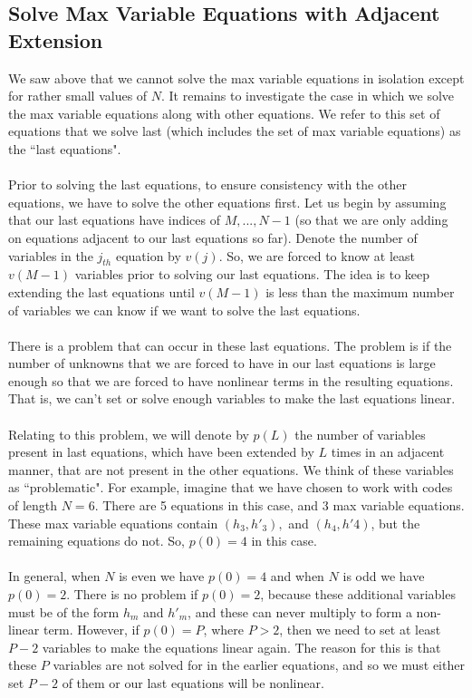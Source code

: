 \documentclass[a4paper]{article}
\begin{document}
\subsection*{Solve Max Variable Equations with  Adjacent Extension}
We saw above that we cannot solve the max variable equations in isolation except for rather small values of $N$. It remains to investigate the case in which we solve the max variable equations along with other equations. We refer to this set of equations that we solve last (which includes the set of max variable equations) as the ``last equations".
\\\\
Prior to solving the last equations, to ensure consistency with the other equations, we have to solve the other equations first. Let us begin by assuming that our last equations have indices of $M, ...,N-1$ (so that we are only adding on equations adjacent to our last equations so far). Denote the number of variables in the $j_{th}$ equation by $v(j)$. So, we are forced to know at least $v(M-1)$ variables prior to solving our last equations. The idea is to keep extending the last equations until $v(M-1)$ is less than the maximum number of variables we can know if we want to solve the last equations.
\\\\
There is a problem that can occur in  these last equations. The problem is if the number of unknowns that we are forced to have in our last equations is large enough so that we are forced to have nonlinear terms in the resulting equations. That is, we can't set or solve enough variables to make the last equations linear. 
\\\\
Relating to this problem, we will denote by $p(L)$ the number of variables present in last equations, which have been extended by $L$ times in an adjacent manner, that are not present in the other equations. We think of these variables as ``problematic". For example, imagine that we have chosen to work with codes of length $N=6$. There are 5 equations in this case, and 3 max variable equations. These max variable equations contain $(h_3,h'_3),$ and $ (h_4,h'4)$, but the remaining equations do not. So, $p(0) = 4$ in this case. 
\\\\
In general, when $N$ is even we have $p(0) = 4$ and when $N$ is odd we have $p(0) = 2$. There is no problem if $p(0) = 2$, because these additional variables must be of the form $h_m$ and $h'_m$, and these can never multiply to form a non-linear term. However, if $p(0) = P$, where $P > 2$, then we need to set at least $P-2$ variables to make the equations linear again. The reason for this is that these $P$ variables are not solved for in the earlier equations, and so we must either set $P-2$ of them or our last equations will be nonlinear.
\end{document}
